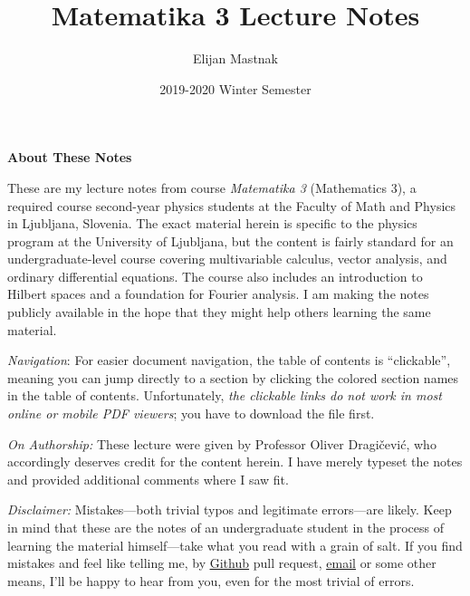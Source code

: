 \documentclass[11pt, a4paper]{article}
\begin{document}
\title{Matematika 3 Lecture Notes}
\author{Elijan Mastnak}
\date{2019-2020 Winter Semester}
\maketitle


\begin{center}
\textbf{About These Notes}
\end{center}
These are my lecture notes from course \textit{Matematika 3} (Mathematics 3), a required course second-year physics students at the Faculty of Math and Physics in Ljubljana, Slovenia. The exact material herein is specific to the physics program at the University of Ljubljana, but the content is fairly standard for an undergraduate-level course covering multivariable calculus, vector analysis, and ordinary differential equations. The course also includes an introduction to Hilbert spaces and a foundation for Fourier analysis. I am making the notes publicly available in the hope that they might help others learning the same material.

\vspace{2mm}
\textit{Navigation}: For easier document navigation, the table of contents is ``clickable'', meaning you can jump directly to a section by clicking the colored section names in the table of contents. Unfortunately, \textit{the clickable links do not work in most online or mobile PDF viewers}; you have to download the file first.


\vspace{2mm}
\textit{On Authorship:} These lecture were given by Professor Oliver Dragi\v{c}evi\'{c}, who accordingly deserves credit for the content herein. I have merely typeset the notes and provided additional comments where I saw fit.

\vspace{2mm}
\textit{Disclaimer:} Mistakes---both trivial typos and legitimate errors---are likely. Keep in mind that these are the notes of an undergraduate student in the process of learning the material himself---take what you read with a grain of salt. If you find mistakes and feel like telling me, by \href{https://github.com/ejmastnak/fmf}{\underline{Github}} pull request, \href{mailto:ejmastnak@gmail.com}{\underline{email}} or some other means, I'll be happy to hear from you, even for the most trivial of errors.

 \newpage

\tableofcontents

\newpage
\end{document}
